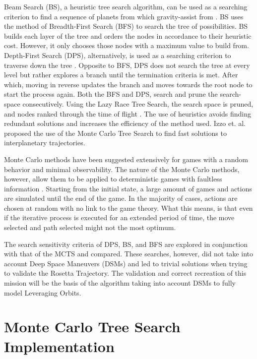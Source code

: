\documentclass[letterpaper, preprint, paper,11pt]{AAS}	%
\begin{document}
Beam Search (BS), a heuristic tree search algorithm, can be used as a searching criterion to find a sequence of planets from which gravity-assist from \cite{Penas2019}. BS uses the method of Breadth-First Search (BFS) to search the tree of possibilities. BS builds each layer of the tree and orders the nodes in accordance to their heuristic cost. However, it only chooses those nodes with a maximum value to build from. Depth-First Search (DPS), alternatively, is used as a searching criterion to traverse down the tree \cite{Izzo2013}. Opposite to BFS, DPS does not search the tree at every level but rather explores a branch until the termination criteria is met. After which, moving in reverse updates the branch and moves towards the root node to start the process again. Both the BFS and DPS, search and prune the search- space consecutively. Using the Lazy Race Tree Search, the search space is pruned, and nodes ranked through the time of flight \cite{Izzo2013}. The use of heuristics avoids finding redundant solutions and increases the efficiency of the method used. Izzo et. al. \cite{Hennes2015} proposed the use of the Monte Carlo Tree Search to find fast solutions to interplanetary trajectories.  

Monte Carlo methods have been suggested extensively for games with a random behavior and minimal observability. The nature of the Monte Carlo methods, however, allow them to be applied to deterministic games with faultless information \cite{Browne2012}. Starting from the initial state, a large amount of games and actions are simulated until the end of the game. In the majority of cases, actions are chosen at random with no link to the game theory. What this means, is that even if the iterative process is executed for an extended period of time, the move selected and path selected might not the most optimum.  

The search sensitivity criteria of DPS, BS, and BFS are explored in conjunction with that of the MCTS and compared. These searches, however, did not take into account Deep Space Maneuvers (DSMs) and led to trivial solutions when trying to validate the Rosetta Trajectory. The validation and correct recreation of this mission will be the basis of the algorithm taking into account DSMs to fully model Leveraging Orbits. 

\section{Monte Carlo Tree Search Implementation}
\end{document}
